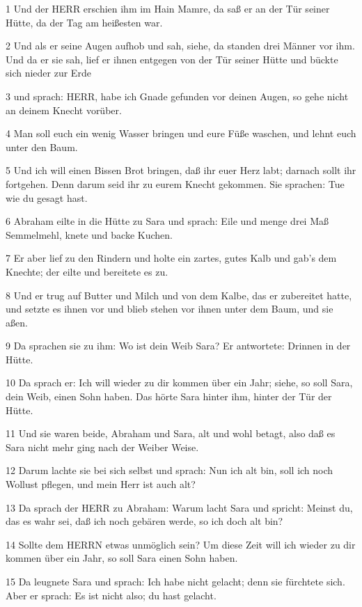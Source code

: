 \par 1 Und der HERR erschien ihm im Hain Mamre, da saß er an der Tür seiner Hütte, da der Tag am heißesten war.
\par 2 Und als er seine Augen aufhob und sah, siehe, da standen drei Männer vor ihm. Und da er sie sah, lief er ihnen entgegen von der Tür seiner Hütte und bückte sich nieder zur Erde
\par 3 und sprach: HERR, habe ich Gnade gefunden vor deinen Augen, so gehe nicht an deinem Knecht vorüber.
\par 4 Man soll euch ein wenig Wasser bringen und eure Füße waschen, und lehnt euch unter den Baum.
\par 5 Und ich will einen Bissen Brot bringen, daß ihr euer Herz labt; darnach sollt ihr fortgehen. Denn darum seid ihr zu eurem Knecht gekommen. Sie sprachen: Tue wie du gesagt hast.
\par 6 Abraham eilte in die Hütte zu Sara und sprach: Eile und menge drei Maß Semmelmehl, knete und backe Kuchen.
\par 7 Er aber lief zu den Rindern und holte ein zartes, gutes Kalb und gab's dem Knechte; der eilte und bereitete es zu.
\par 8 Und er trug auf Butter und Milch und von dem Kalbe, das er zubereitet hatte, und setzte es ihnen vor und blieb stehen vor ihnen unter dem Baum, und sie aßen.
\par 9 Da sprachen sie zu ihm: Wo ist dein Weib Sara? Er antwortete: Drinnen in der Hütte.
\par 10 Da sprach er: Ich will wieder zu dir kommen über ein Jahr; siehe, so soll Sara, dein Weib, einen Sohn haben. Das hörte Sara hinter ihm, hinter der Tür der Hütte.
\par 11 Und sie waren beide, Abraham und Sara, alt und wohl betagt, also daß es Sara nicht mehr ging nach der Weiber Weise.
\par 12 Darum lachte sie bei sich selbst und sprach: Nun ich alt bin, soll ich noch Wollust pflegen, und mein Herr ist auch alt?
\par 13 Da sprach der HERR zu Abraham: Warum lacht Sara und spricht: Meinst du, das es wahr sei, daß ich noch gebären werde, so ich doch alt bin?
\par 14 Sollte dem HERRN etwas unmöglich sein? Um diese Zeit will ich wieder zu dir kommen über ein Jahr, so soll Sara einen Sohn haben.
\par 15 Da leugnete Sara und sprach: Ich habe nicht gelacht; denn sie fürchtete sich. Aber er sprach: Es ist nicht also; du hast gelacht.

